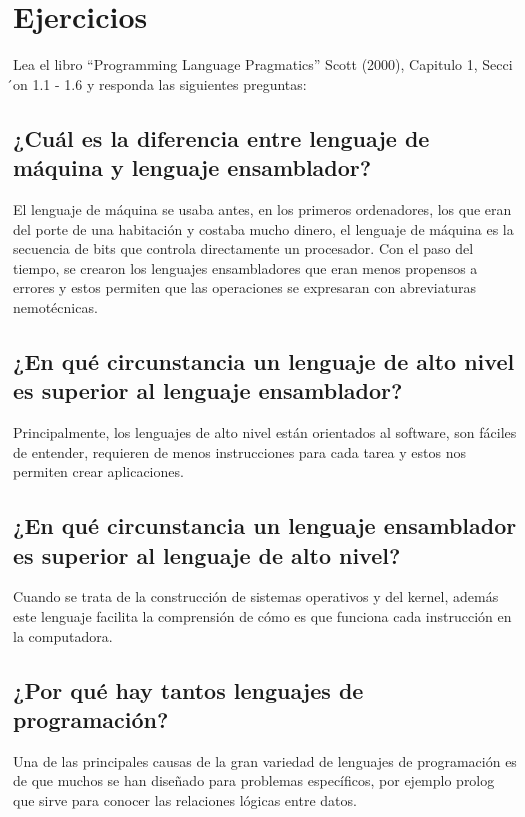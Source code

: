 \section{Ejercicios}

Lea el libro “Programming Language Pragmatics” Scott (2000), Capitulo 1, Secci ́on 1.1 - 1.6
y responda las siguientes preguntas:

\subsection{¿Cuál es la diferencia entre lenguaje de máquina y lenguaje ensamblador?}

El lenguaje de máquina se usaba antes, en  los primeros ordenadores, los que eran del porte de una habitación y costaba mucho dinero, el lenguaje de máquina es la secuencia de bits que controla directamente un procesador. Con el paso del tiempo, se crearon los lenguajes ensambladores que eran menos propensos a errores y estos permiten que las operaciones  se expresaran con abreviaturas nemotécnicas.


\subsection{¿En qué circunstancia un lenguaje de alto nivel es superior al lenguaje ensamblador?}

Principalmente, los lenguajes de alto nivel están orientados al software, son fáciles de entender, requieren de menos instrucciones para cada tarea y estos nos permiten crear aplicaciones.

\subsection{¿En qué circunstancia un lenguaje ensamblador es superior al lenguaje de alto nivel?}

Cuando se trata de la construcción de sistemas operativos  y del kernel, además este lenguaje facilita la comprensión de cómo es que funciona cada instrucción en la computadora.


\subsection{¿Por qué hay tantos lenguajes de programación? }

Una de las principales causas de la gran variedad de lenguajes de programación es de que muchos se han diseñado para problemas específicos, por ejemplo prolog que sirve para conocer las relaciones lógicas entre datos. 

